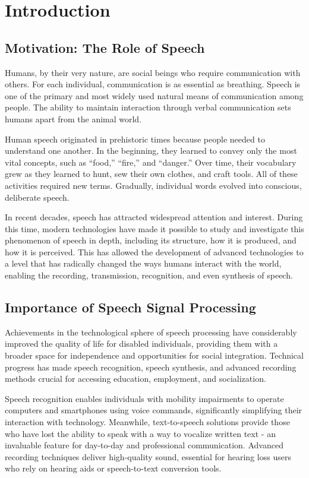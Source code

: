 \chapter{Introduction}
\onehalfspacing

\section{Motivation: The Role of Speech}
Humans, by their very nature, are social beings who require communication with others. For each individual, communication is as essential as breathing. 
Speech is one of the primary and most widely used natural means of communication among people. 
The ability to maintain interaction through verbal communication sets humans apart from the animal world.

Human speech originated in prehistoric times because people needed to understand one another. 
In the beginning, they learned to convey only the most vital concepts, such as “food,” “fire,” and “danger.” 
Over time, their vocabulary grew as they learned to hunt, sew their own clothes, and craft tools. 
All of these activities required new terms. Gradually, individual words evolved into conscious, deliberate speech.

In recent decades, speech has attracted widespread attention and interest. 
During this time, modern technologies have made it possible to study and investigate this phenomenon of speech in depth, including its structure, how it is produced, and how it is perceived.
This has allowed the development of advanced technologies to a level that has radically changed the ways humans interact with the world, enabling the recording, transmission, recognition, and even synthesis of speech.

\section{Importance of Speech Signal Processing}

Achievements in the technological sphere of speech processing have considerably improved the quality of life for disabled individuals, 
providing them with a broader space for independence and opportunities for social integration. 
Technical progress has made speech recognition, speech synthesis, and advanced recording methods crucial for accessing education, employment, and socialization.

Speech recognition enables individuals with mobility impairments to operate computers and smartphones using voice commands, significantly simplifying their interaction with technology. 
Meanwhile, text-to-speech solutions provide those who have lost the ability to speak with a way to vocalize written text - an invaluable feature for day-to-day and professional communication.
Advanced recording techniques deliver high-quality sound, essential for hearing loss users who rely on hearing aids or speech-to-text conversion tools.


